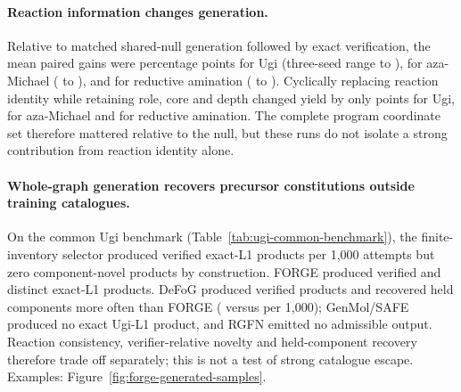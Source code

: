 \documentclass{article}
\begin{document}
\paragraph{Reaction information changes generation.}
Relative to matched shared-null generation followed by exact verification, the mean paired gains were
\ForgeTableOneNullUgiDifferencePP{} percentage
points for Ugi (three-seed range \ForgeTableOneNullUgiRangeLowPP{} to
\ForgeTableOneNullUgiRangeHighPP{}), \ForgeTableOneNullBLDifferencePP{} for aza-Michael
(\ForgeTableOneNullBLRangeLowPP{} to \ForgeTableOneNullBLRangeHighPP{}), and
\ForgeTableOneNullLXDifferencePP{} for reductive amination (\ForgeTableOneNullLXRangeLowPP{} to
\ForgeTableOneNullLXRangeHighPP{}). Cyclically replacing reaction identity while retaining role, core
and depth changed yield by only \ForgeTableOneCyclicUgiDifferencePP{} points for Ugi,
\ForgeTableOneCyclicBLDifferencePP{} for aza-Michael and \ForgeTableOneCyclicLXDifferencePP{} for
reductive amination. The complete program coordinate set therefore mattered relative to the null,
but these runs do not isolate a strong contribution from reaction identity alone.

\paragraph{Whole-graph generation recovers precursor constitutions outside training catalogues.}
On the common Ugi benchmark (Table~\ref{tab:ugi-common-benchmark}), the finite-inventory selector
produced \ForgeProseCommonSelectorExactPerThousand{} verified exact-L1 products per 1,000 attempts
but zero component-novel products by construction. FORGE produced
\ForgeProseCommonForgeExactPerThousand{} verified and \ForgeProseCommonForgeDistinctPerThousand{}
distinct exact-L1 products. DeFoG produced \ForgeProseCommonDefogExactPerThousand{} verified products
and recovered held components more often than FORGE
(\ForgeProseCommonDefogHeldPerThousand{} versus \ForgeProseCommonForgeHeldPerThousand{} per 1,000);
GenMol/SAFE produced no exact Ugi-L1 product, and RGFN emitted no admissible output. Reaction
consistency, verifier-relative novelty and held-component recovery therefore trade off separately;
this is not a test of strong catalogue escape. Examples: Figure~\ref{fig:forge-generated-samples}.
\end{document}
